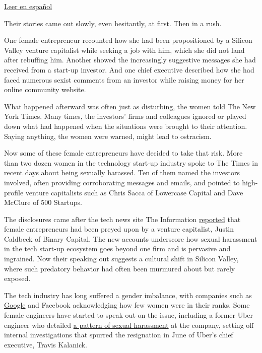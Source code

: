 \href{https://www.nytimes3xbfgragh.onion/es/2017/07/04/hay-un-desequilibrio-de-poder-enorme-mujeres-hablan-del-acoso-sexual-en-silicon-valley}{Leer
en español}

Their stories came out slowly, even hesitantly, at first. Then in a
rush.

One female entrepreneur recounted how she had been propositioned by a
Silicon Valley venture capitalist while seeking a job with him, which
she did not land after rebuffing him. Another showed the increasingly
suggestive messages she had received from a start-up investor. And one
chief executive described how she had faced numerous sexist comments
from an investor while raising money for her online community website.

What happened afterward was often just as disturbing, the women told The
New York Times. Many times, the investors' firms and colleagues ignored
or played down what had happened when the situations were brought to
their attention. Saying anything, the women were warned, might lead to
ostracism.

Now some of these female entrepreneurs have decided to take that risk.
More than two dozen women in the technology start-up industry spoke to
The Times in recent days about being sexually harassed. Ten of them
named the investors involved, often providing corroborating messages and
emails, and pointed to high-profile venture capitalists such as Chris
Sacca of Lowercase Capital and Dave McClure of 500 Startups.

The disclosures came after the tech news site The Information
\href{https://www.theinformation.com/silicon-valley-women-tell-of-vcs-unwanted-advances}{reported}
that female entrepreneurs had been preyed upon by a venture capitalist,
Justin Caldbeck of Binary Capital. The new accounts underscore how
sexual harassment in the tech start-up ecosystem goes beyond one firm
and is pervasive and ingrained. Now their speaking out suggests a
cultural shift in Silicon Valley, where such predatory behavior had
often been murmured about but rarely exposed.

The tech industry has long suffered a gender imbalance, with companies
such as \href{https://www.google.com/diversity/}{Google} and Facebook
acknowledging how few women were in their ranks. Some female engineers
have started to speak out on the issue, including a former Uber engineer
who detailed
\href{https://www.nytimes3xbfgragh.onion/2017/02/19/business/uber-sexual-harassment-investigation.html}{a
pattern of sexual harassment} at the company, setting off internal
investigations that spurred the resignation in June of Uber's chief
executive, Travis Kalanick.

